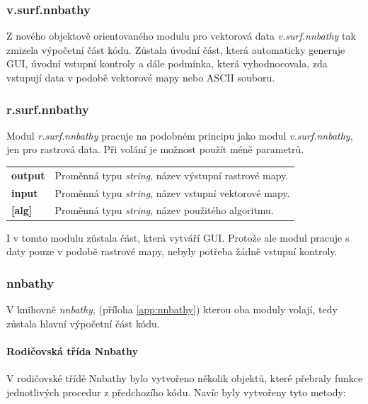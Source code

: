 \documentclass[12pt,a4paper]{article}
\begin{document}
\subsubsection{v.surf.nnbathy}

Z nového objektově orientovaného modulu pro vektorová data \emph{v.surf.nnbathy} tak zmizela výpočetní část kódu. Zůstala úvodní část, která automaticky generuje GUI,
úvodní vstupní kontroly a dále podmínka, která vyhodnocovala, zda vstupují data v podobě
vektorové mapy nebo ASCII souboru.

\subsubsection{r.surf.nnbathy}

Modul \emph{r.surf.nnbathy} pracuje na podobném principu jako modul
\emph{v.surf.nnbathy}, jen pro rastrová data. Při volání je možnost
použít méně parametrů.

\begin{tabular}{ll}
\textbf{output}& Proměnná typu \emph{string}, název výstupní rastrové mapy.\\
\textbf{input}& Proměnná typu \emph{string}, název vstupní vektorové mapy.\\
\textbf{[alg]}& Proměnná typu \emph{string}, název použitého algoritmu.\\
\end{tabular}

I v tomto modulu zůstala část, která vytváří GUI. Protože ale modul
pracuje s daty pouze v podobě rastrové mapy, nebyly potřeba žádně
vstupní kontroly.

\newpage
\subsubsection{nnbathy}

V knihovně {\em nnbathy}, (příloha \ref{app:nnbathy}) kterou oba moduly volají, tedy zůstala hlavní
výpočetní část kódu.

\paragraph{Rodičovská třída Nnbathy} V rodičovské třídě Nnbathy bylo
vytvořeno několik objektů, které přebraly funkce jednotlivých procedur
z předchozího kódu. Navíc byly vytvořeny tyto metody:
\end{document}
